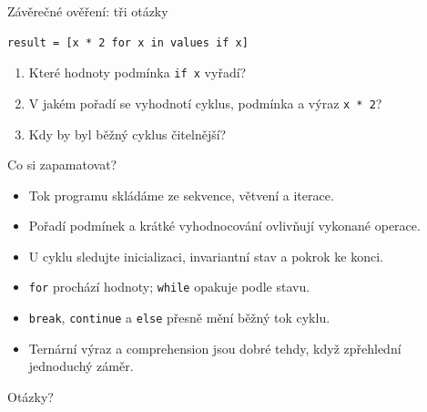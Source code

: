 \documentclass[aspectratio=169,t]{beamer}
\begin{document}
\begin{frame}[fragile]{Závěrečné ověření: tři otázky}
\begin{lstlisting}[style=python]
result = [x * 2 for x in values if x]
\end{lstlisting}
  \begin{enumerate}
    \item Které hodnoty podmínka \texttt{if x} vyřadí?
    \item V jakém pořadí se vyhodnotí cyklus, podmínka a výraz \texttt{x * 2}?
    \item Kdy by byl běžný cyklus čitelnější?
  \end{enumerate}
\end{frame}

\begin{frame}{Co si zapamatovat?}
  \begin{itemize}
    \item Tok programu skládáme ze sekvence, větvení a iterace.
    \item Pořadí podmínek a krátké vyhodnocování ovlivňují vykonané operace.
    \item U cyklu sledujte inicializaci, invariantní stav a pokrok ke konci.
    \item \texttt{for} prochází hodnoty; \texttt{while} opakuje podle stavu.
    \item \texttt{break}, \texttt{continue} a \texttt{else} přesně mění běžný tok cyklu.
    \item Ternární výraz a comprehension jsou dobré tehdy, když zpřehlední jednoduchý záměr.
  \end{itemize}
  \vspace{2mm}
  \centering\Large Otázky?
\end{frame}
\end{document}
